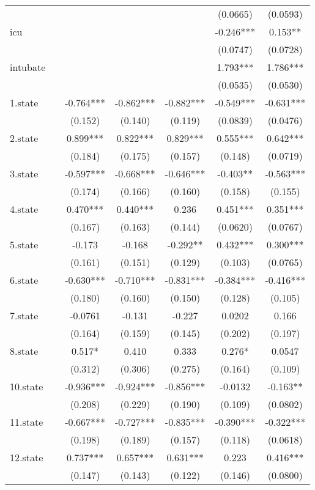 \documentclass[]{article}
\begin{document}
\begin{tabular}{lcccccc}
 &  &  &  &  & (0.0665) & (0.0593) \\
icu &  &  &  &  & -0.246*** & 0.153** \\
 &  &  &  &  & (0.0747) & (0.0728) \\
intubate &  &  &  &  & 1.793*** & 1.786*** \\
 &  &  &  &  & (0.0535) & (0.0530) \\
1.state &  & -0.764*** & -0.862*** & -0.882*** & -0.549*** & -0.631*** \\
 &  & (0.152) & (0.140) & (0.119) & (0.0839) & (0.0476) \\
2.state &  & 0.899*** & 0.822*** & 0.829*** & 0.555*** & 0.642*** \\
 &  & (0.184) & (0.175) & (0.157) & (0.148) & (0.0719) \\
3.state &  & -0.597*** & -0.668*** & -0.646*** & -0.403** & -0.563*** \\
 &  & (0.174) & (0.166) & (0.160) & (0.158) & (0.155) \\
4.state &  & 0.470*** & 0.440*** & 0.236 & 0.451*** & 0.351*** \\
 &  & (0.167) & (0.163) & (0.144) & (0.0620) & (0.0767) \\
5.state &  & -0.173 & -0.168 & -0.292** & 0.432*** & 0.300*** \\
 &  & (0.161) & (0.151) & (0.129) & (0.103) & (0.0765) \\
6.state &  & -0.630*** & -0.710*** & -0.831*** & -0.384*** & -0.416*** \\
 &  & (0.180) & (0.160) & (0.150) & (0.128) & (0.105) \\
7.state &  & -0.0761 & -0.131 & -0.227 & 0.0202 & 0.166 \\
 &  & (0.164) & (0.159) & (0.145) & (0.202) & (0.197) \\
8.state &  & 0.517* & 0.410 & 0.333 & 0.276* & 0.0547 \\
 &  & (0.312) & (0.306) & (0.275) & (0.164) & (0.109) \\
10.state &  & -0.936*** & -0.924*** & -0.856*** & -0.0132 & -0.163** \\
 &  & (0.208) & (0.229) & (0.190) & (0.109) & (0.0802) \\
11.state &  & -0.667*** & -0.727*** & -0.835*** & -0.390*** & -0.322*** \\
 &  & (0.198) & (0.189) & (0.157) & (0.118) & (0.0618) \\
12.state &  & 0.737*** & 0.657*** & 0.631*** & 0.223 & 0.416*** \\
 &  & (0.147) & (0.143) & (0.122) & (0.146) & (0.0800) \\

\end{tabular}
\end{document}
